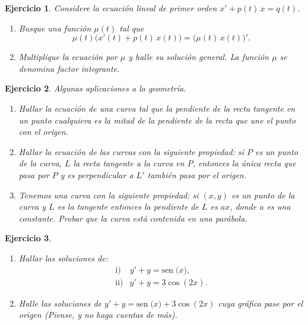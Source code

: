 \documentclass[11pt,a4paper,pdftex]{amsart}
\newtheorem{ej}{Ejercicio}%
\numberwithin{equation}{section}%
\newcommand{\bej}[1]{\begin{ej}\rm{#1}}
\newcommand{\eej}{\end{ej}\vspace{-0.2cm}}
\newcommand{\0}{\mathbb O}
\newcommand{\8}{\infty}
\newcommand{\sen}[1]{\mbox{sen}\;{#1}}
\begin{document}

\bej Considere la ecuación lineal de primer orden
$x'+p(t)\,x=q(t)$.
\begin{enumerate}
\item Busque una función $\mu(t)$ tal que
$$
\mu(t)\big(x'(t)+p(t)\,x(t)\big)=\big(\mu(t)\,x(t)\big)'.
$$

\item Multiplique la ecuación por $\mu$ y halle su solución 
general. La función $\mu$ se denomina {\it factor integrante}.
\end{enumerate}

\eej

\bigskip

\bej 
Algunas aplicaciones a la geometría.
\begin{enumerate}
\item Hallar la ecuaci\'on de una curva tal que la pendiente de la
recta tangente en un punto cualquiera es la mitad de la
pendiente de la recta que une el punto con el origen.

\item Hallar la ecuaci\'on de las curvas con la siguiente propiedad: si $P$ es 
un punto de la curva, $L$ la recta tangente a la curva en $P$, entonces la 
única recta que pasa por $P$ y es perpendicular a $L'$ también pasa por el 
origen.

\item Tenemos una curva con la siguiente propiedad: si $(x,y)$ es un punto de 
la curva y $L$ es la tangente entonces la pendiente de $L$ es $a x$, donde $a$
es una constante. Probar que la curva está contenida en una parábola. 
\end{enumerate}
\eej




 \bej\ \ \newline

\begin{enumerate}
\item Hallar las soluciones de:
\[
\begin{array}{ll}
\mbox{i)}&y'+y= \sen(x), \\
\mbox{ii)}&y'+y=3 \cos(2x).
\end{array}
\]

\item Halle las soluciones de $ y'+y=\sen(x) +3 \cos(2x)  $
cuya gr\'afica pase por el origen (Piense, y no haga cuentas de m\'as).
\end{enumerate}
\eej
\bigskip
\end{document}
